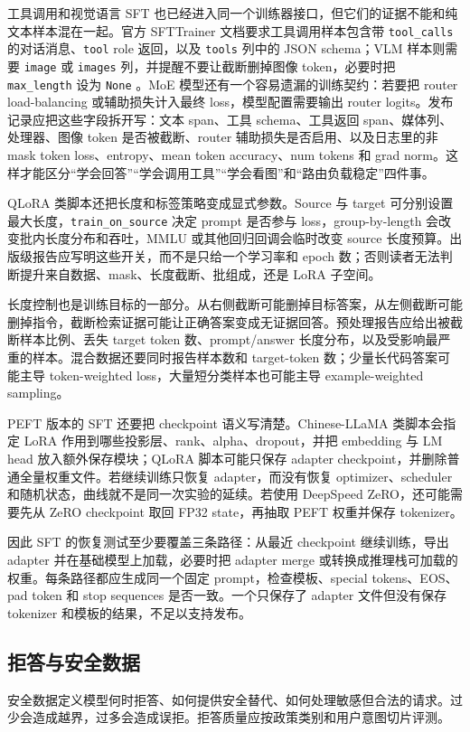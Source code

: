 \documentclass[UTF8,zihao=-4,openany]{ctexbook}
\begin{document}
工具调用和视觉语言 SFT 也已经进入同一个训练器接口，但它们的证据不能和纯文本样本混在一起。官方 SFTTrainer 文档要求工具调用样本包含带 \texttt{tool\_calls} 的对话消息、\texttt{tool} role 返回，以及 \texttt{tools} 列中的 JSON schema；VLM 样本则需要 \texttt{image} 或 \texttt{images} 列，并提醒不要让截断删掉图像 token，必要时把 \texttt{max\_length} 设为 \texttt{None} \cite{huggingface2026trlsfttrainer}。MoE 模型还有一个容易遗漏的训练契约：若要把 router load-balancing 或辅助损失计入最终 loss，模型配置需要输出 router logits。发布记录应把这些字段拆开写：文本 span、工具 schema、工具返回 span、媒体列、处理器、图像 token 是否被截断、router 辅助损失是否启用、以及日志里的非 mask token loss、entropy、mean token accuracy、num tokens 和 grad norm。这样才能区分“学会回答”“学会调用工具”“学会看图”和“路由负载稳定”四件事。

QLoRA 类脚本还把长度和标签策略变成显式参数。Source 与 target 可分别设置最大长度，\texttt{train\_on\_source} 决定 prompt 是否参与 loss，group-by-length 会改变批内长度分布和吞吐，MMLU 或其他回归回调会临时改变 source 长度预算。出版级报告应写明这些开关，而不是只给一个学习率和 epoch 数；否则读者无法判断提升来自数据、mask、长度截断、批组成，还是 LoRA 子空间。

长度控制也是训练目标的一部分。从右侧截断可能删掉目标答案，从左侧截断可能删掉指令，截断检索证据可能让正确答案变成无证据回答。预处理报告应给出被截断样本比例、丢失 target token 数、prompt/answer 长度分布，以及受影响最严重的样本。混合数据还要同时报告样本数和 target-token 数；少量长代码答案可能主导 token-weighted loss，大量短分类样本也可能主导 example-weighted sampling。

PEFT 版本的 SFT 还要把 checkpoint 语义写清楚。Chinese-LLaMA 类脚本会指定 LoRA 作用到哪些投影层、rank、alpha、dropout，并把 embedding 与 LM head 放入额外保存模块；QLoRA 脚本可能只保存 adapter checkpoint，并删除普通全量权重文件。若继续训练只恢复 adapter，而没有恢复 optimizer、scheduler 和随机状态，曲线就不是同一次实验的延续。若使用 DeepSpeed ZeRO，还可能需要先从 ZeRO checkpoint 取回 FP32 state，再抽取 PEFT 权重并保存 tokenizer。

因此 SFT 的恢复测试至少要覆盖三条路径：从最近 checkpoint 继续训练，导出 adapter 并在基础模型上加载，必要时把 adapter merge 或转换成推理栈可加载的权重。每条路径都应生成同一个固定 prompt，检查模板、special tokens、EOS、pad token 和 stop sequences 是否一致。一个只保存了 adapter 文件但没有保存 tokenizer 和模板的结果，不足以支持发布。

\subsection{拒答与安全数据}
安全数据定义模型何时拒答、如何提供安全替代、如何处理敏感但合法的请求。过少会造成越界，过多会造成误拒。拒答质量应按政策类别和用户意图切片评测。
\end{document}
